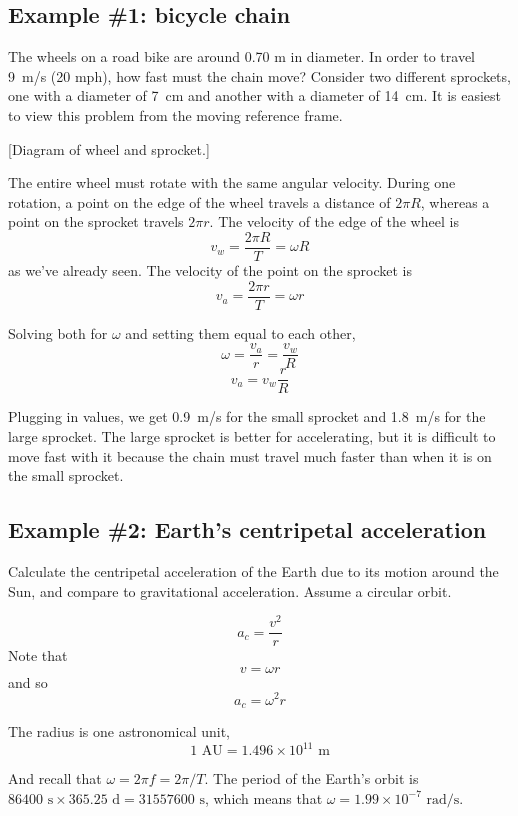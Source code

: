 
\subsection{Example \#1: bicycle chain}
The wheels on a road bike are around 0.70 m in diameter. In order to travel 9~m/s (20 mph), how fast must the chain move? Consider two different sprockets, one with a diameter of 7~cm and another with a diameter of 14~cm. It is easiest to view this problem from the moving reference frame.

[Diagram of wheel and sprocket.]
\vspace{3cm}


The entire wheel must rotate with the same angular velocity. During one rotation, a point on the edge of the wheel travels a distance of $2\pi R$, whereas a point on the sprocket travels $2\pi r$. The velocity of the edge of the wheel is
$$v_w = \frac{2\pi R}{T} = \omega R$$
as we've already seen. The velocity of the point on the sprocket is
$$v_a = \frac{2\pi r}{T} = \omega r$$

Solving both for $\omega$ and setting them equal to each other,
$$\omega = \frac{v_a}{r} = \frac{v_w}{R}$$
$$v_a = v_w\frac{r}{R}$$

Plugging in values, we get 0.9~m/s for the small sprocket and 1.8~m/s for the large sprocket. The large sprocket is better for accelerating, but it is difficult to move fast with it because the chain must travel much faster than when it is on the small sprocket.



\subsection{Example \#2: Earth's centripetal acceleration}
Calculate the centripetal acceleration of the Earth due to its motion around the Sun, and compare to gravitational acceleration. Assume a circular orbit.

$$a_c = \frac{v^2}{r}$$
Note that
$$v = \omega r$$
and so
$$a_c = \omega^2 r$$

The radius is one astronomical unit,
$$1 \mbox{ AU} = 1.496\times 10^{11}\mbox{ m}$$

And recall that $\omega=2\pi f = 2\pi/T$. The period of the Earth's orbit is $86400\mbox{ s}\times 365.25\mbox{ d}=31557600\mbox{ s}$, which means that $\omega = 1.99\times 10^{-7}\mbox{ rad/s}$.

